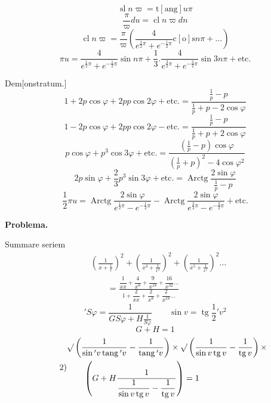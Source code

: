 \begingroup
\setlength{\headheight}{25pt}
\makeatletter\tagsleft@true\let\veqno\@@leqno\makeatother
{}
\noindent [S.\ 37]
\[\operatorname{sl}n\varpi=\operatorname{t[ang]}u\pi\]
\[\frac\pi\varpi du=\operatorname{cl}n\varpi dn\]
\[\operatorname{cl}n\varpi=\frac\pi\varpi\left(\frac4{e^{\frac12\pi}+e^{-\frac12\pi}}\operatorname{c[o]s}n\pi+\ldots\right)\]
\[\pi u=\frac4{e^{\frac12\pi}+e^{-\frac12\pi}}\sin n\pi
+\frac13.\frac4{e^{\frac32\pi}+e^{-\frac32\pi}}\sin3n\pi+\text{etc.}\]
\par\hfill Dem[onstratum.]
\[1+2p\cos\varphi+2pp\cos2\varphi+\text{etc.}=\frac{\frac1p-p}{\frac1p+p-2\cos\varphi}\]
\[1-2p\cos\varphi+2pp\cos2\varphi-\text{etc.}=\frac{\frac1p-p}{\frac1p+p+2\cos\varphi}\]
\[p\cos\varphi+p^3\cos3\varphi+\text{etc.}=\frac{\left(\frac1p-p\right)\cos\varphi}{\left(\frac1p+p\right)^2-4\cos\varphi^2}\]
\[2p\sin\varphi+\frac23p^3\sin3\varphi+\text{etc.}=\operatorname{Arctg}\frac{2\sin\varphi}{\frac1p-p}\]
\[\frac12\pi u=\operatorname{Arctg}\frac{2\sin\varphi}{e^{\frac12\pi}-e^{-\frac12\pi}}
-\operatorname{Arctg}\frac{2\sin\varphi}{e^{\frac32\pi}-e^{-\frac32\pi}}+\text{etc.}\]
\ClosingRule
\clearpage
{}
\noindent [S.\ 37]
\begin{center}\textbf{Problema.}\end{center}
\par\indent Summare seriem
\[\begin{aligned}
&\left(\frac1{x+\frac1x}\right)^2+\left(\frac1{x^3+\frac1{x^3}}\right)^2
+\left(\frac1{x^5+\frac1{x^5}}\right)^2\ldots\\
&\qquad=\frac{\dfrac1{xx}+\dfrac4{x^8}+\dfrac9{x^{18}}+\dfrac{16}{x^{32}}\ldots}
{1+\dfrac2{xx}+\dfrac2{x^8}+\dfrac2{x^{18}}\ldots}
\end{aligned}\]
\ClosingRule
\noindent [S.\ 38]
\[{}'S\varphi=\frac1{GS\varphi+H\frac1{S\varphi}}\qquad\sin v=\operatorname{tg}\frac12{}'v^2\]
\begin{equation*}\tag*{1)}G+H=1\end{equation*}
\begin{equation*}\tag*{2)}
\begin{aligned}
&\surd\left(\frac1{\sin{}'v\operatorname{tang}{}'v}-\frac1{\operatorname{tang}{}'v}\right)
\times\surd\left(\frac1{\sin v\operatorname{tg}v}-\frac1{\operatorname{tg}v}\right)\times\\
&\qquad\left(G+H\frac1{\dfrac1{\sin v\operatorname{tg}v}-\dfrac1{\operatorname{tg}v}}\right)=1
\end{aligned}
\end{equation*}
